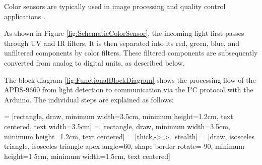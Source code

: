 Color sensors are typically used in image processing and quality control applications \cite{Avago:2015}.



As shown in Figure \ref{fig:SchematicColorSensor}, the incoming light first passes through UV and IR filters. It is then separated into its red, green, blue, and unfiltered components by color filters. These filtered components are subsequently converted from analog to digital units, as described below.

\begin{center}
	
	\label{fig:SchematicColorSensor}
\end{center}

The block diagram \ref{fig:FunctionalBlockDiagram} shows the processing flow of the APDS-9660 from light detection to communication via the I²C protocol with the Arduino. The individual steps are explained as follows:

 = [rectangle, draw, minimum width=3.5cm, minimum height=1.2cm, text centered, text width=3.5cm]
 = [rectangle, draw, minimum width=3.5cm, minimum height=1.2cm, text centered]
 = [thick,->,>=stealth]
 = [draw, isosceles triangle, isosceles triangle apex angle=60, shape border rotate=-90, minimum height=1.5cm, minimum width=1.5cm, text centered]

